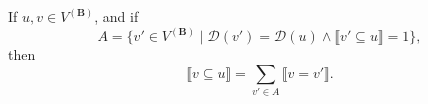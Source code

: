 If $u, v \in V^{(\mathbf{B})}$, and if
$$A = \{v' \in V^{(\mathbf{B})} \mid \mathcal{D}(v') = \mathcal{D}(u) \land \llbracket v' \subseteq u \rrbracket = 1\},$$
then
$$\llbracket v \subseteq u \rrbracket = \sum_{v' \in A} \llbracket v = v' \rrbracket.$$
